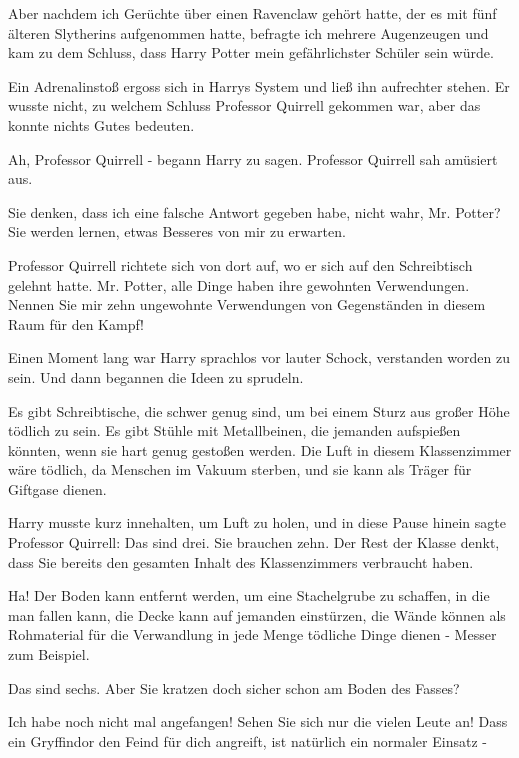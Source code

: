 Aber nachdem ich Gerüchte über einen Ravenclaw gehört hatte, der es mit fünf
älteren Slytherins aufgenommen hatte, befragte ich mehrere Augenzeugen und kam
zu dem Schluss, dass Harry Potter mein gefährlichster Schüler sein würde.\grqq{}

Ein Adrenalinstoß ergoss sich in Harrys System und ließ ihn aufrechter stehen.
Er wusste nicht, zu welchem Schluss Professor Quirrell gekommen war, aber das
konnte nichts Gutes bedeuten.

\glqq{}Ah, Professor Quirrell -\grqq{} begann Harry zu sagen. Professor Quirrell
sah amüsiert aus.

\glqq{}Sie denken, dass ich eine falsche Antwort gegeben habe, nicht wahr, Mr.
Potter? Sie werden lernen, etwas Besseres von mir zu erwarten.\grqq{}

Professor Quirrell richtete sich von dort auf, wo er sich auf den Schreibtisch
gelehnt hatte. \glqq{}Mr. Potter, alle Dinge haben ihre gewohnten Verwendungen.
Nennen Sie mir zehn ungewohnte Verwendungen von Gegenständen in diesem Raum für
den Kampf!\grqq{}

Einen Moment lang war Harry sprachlos vor lauter Schock, verstanden worden zu
sein. Und dann begannen die Ideen zu sprudeln.

\glqq{}Es gibt Schreibtische, die schwer genug sind, um bei einem Sturz aus
großer Höhe tödlich zu sein. Es gibt Stühle mit Metallbeinen, die jemanden
aufspießen könnten, wenn sie hart genug gestoßen werden. Die Luft in diesem
Klassenzimmer wäre tödlich, da Menschen im Vakuum sterben, und sie kann als
Träger für Giftgase dienen.\grqq{}

Harry musste kurz innehalten, um Luft zu holen, und in diese Pause hinein sagte
Professor Quirrell: \glqq{}Das sind drei. Sie brauchen zehn. Der Rest der Klasse
denkt, dass Sie bereits den gesamten Inhalt des Klassenzimmers verbraucht
haben.\grqq{}

\glqq{}Ha! Der Boden kann entfernt werden, um eine Stachelgrube zu schaffen, in
die man fallen kann, die Decke kann auf jemanden einstürzen, die Wände können
als Rohmaterial für die Verwandlung in jede Menge tödliche Dinge dienen - Messer
zum Beispiel.\grqq{}

\glqq{}Das sind sechs. Aber Sie kratzen doch sicher schon am Boden des
Fasses?\grqq{}

\glqq{}Ich habe noch nicht mal angefangen! Sehen Sie sich nur die vielen Leute
an! Dass ein Gryffindor den Feind für dich angreift, ist natürlich ein normaler
Einsatz -\grqq{}

